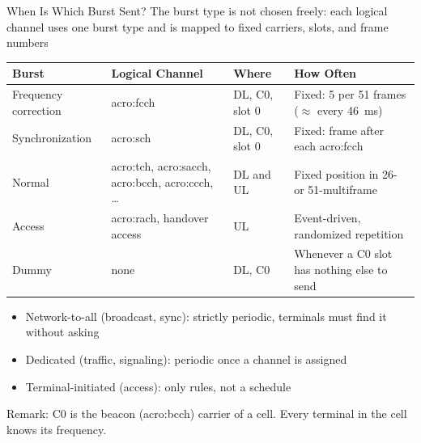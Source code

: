 \begin{frame}{When Is Which Burst Sent?}
  The burst type is not chosen freely: each logical channel uses one burst type and is mapped to fixed carriers, slots, and frame numbers~\cite{etsi.145.002.v18}

  \vspace{0.5em}
  \centering
  \footnotesize
  \begin{tabular}{llll}
    \toprule
    \textbf{Burst} & \textbf{Logical Channel} & \textbf{Where} & \textbf{How Often} \\
    \midrule
    Frequency correction & \acrshort{acro:fcch} & DL, C0, slot 0 & Fixed: 5 per 51 frames ($\approx$ every \qty{46}{\milli\second}) \\
    Synchronization & \acrshort{acro:sch} & DL, C0, slot 0 & Fixed: frame after each \acrshort{acro:fcch} \\
    Normal & \acrshort{acro:tch}, \acrshort{acro:sacch}, \acrshort{acro:bcch}, \acrshort{acro:ccch}, \ldots & DL and UL & Fixed position in 26- or 51-multiframe \\
    Access & \acrshort{acro:rach}, handover access & UL & Event-driven, randomized repetition \\
    Dummy & none & DL, C0 & Whenever a C0 slot has nothing else to send \\
    \bottomrule
  \end{tabular}

  \normalsize
  \raggedright
  \vspace{0.5em}
  \begin{itemize}
    \item Network-to-all (broadcast, sync): strictly periodic, terminals must find it without asking
    \item Dedicated (traffic, signaling): periodic once a channel is assigned
    \item Terminal-initiated (access): only rules, not a schedule
  \end{itemize}
  \alert{Remark:} C0 is the beacon (\acrshort{acro:bcch}) carrier of a cell. Every terminal in the cell knows its frequency.
\end{frame}

